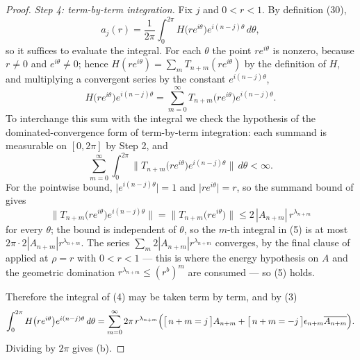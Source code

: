 \begin{proof}
\emph{Step 4: term-by-term integration.}  Fix $j$ and $0<r<1$.  By definition
(30),
\[
  a_j(r)=\frac1{2\pi}\int_0^{2\pi}
    H\bigl(re^{i\theta}\bigr)e^{i(n-j)\theta}\,d\theta,
\]
so it suffices to evaluate the integral.  For each $\theta$ the point
$re^{i\theta}$ is nonzero, because $r\ne0$ and $e^{i\theta}\ne0$; hence
$H(re^{i\theta})=\sum_mT_{n+m}(re^{i\theta})$ by the definition of $H$, and
multiplying a convergent series by the constant $e^{i(n-j)\theta}$,
\begin{equation}\tag{4}
  H\bigl(re^{i\theta}\bigr)e^{i(n-j)\theta}
  =\sum_{m=0}^\infty T_{n+m}\bigl(re^{i\theta}\bigr)e^{i(n-j)\theta} .
\end{equation}
To interchange this sum with the integral we check the hypothesis of the
dominated-convergence form of term-by-term integration: each summand is
measurable on $[0,2\pi]$ by Step 2, and
\begin{equation}\tag{5}
  \sum_{m=0}^\infty\int_0^{2\pi}
    \bigl\|T_{n+m}\bigl(re^{i\theta}\bigr)e^{i(n-j)\theta}\bigr\|\,d\theta
  <\infty .
\end{equation}
For the pointwise bound, $\bigl|e^{i(n-j)\theta}\bigr|=1$ and
$\bigl|re^{i\theta}\bigr|=r$, so the summand bound of
 gives
\[
  \bigl\|T_{n+m}\bigl(re^{i\theta}\bigr)e^{i(n-j)\theta}\bigr\|
  =\bigl\|T_{n+m}\bigl(re^{i\theta}\bigr)\bigr\|
  \le2\,|A_{n+m}|\,r^{\lambda_{n+m}}
\]
for every $\theta$; the bound is independent of $\theta$, so the $m$-th
integral in (5) is at most $2\pi\cdot2|A_{n+m}|r^{\lambda_{n+m}}$.  The series
$\sum_m2|A_{n+m}|r^{\lambda_{n+m}}$ converges, by the final clause of
 applied at $\rho=r$ with $0<r<1$ ---
this is where the energy hypothesis on $A$ and the geometric domination
$r^{\lambda_{n+m}}\le(r^b)^m$ are consumed --- so (5) holds.

Therefore the integral of (4) may be taken term by term, and by (3)
\[
  \int_0^{2\pi}H\bigl(re^{i\theta}\bigr)e^{i(n-j)\theta}\,d\theta
  =\sum_{m=0}^\infty 2\pi\,r^{\lambda_{n+m}}
    \Bigl(\bigl[\,n+m=j\,\bigr]A_{n+m}
      +\bigl[\,n+m=-j\,\bigr]\epsilon_{n+m}\overline{A_{n+m}}\Bigr).
\]
Dividing by $2\pi$ gives (b).
\end{proof}
